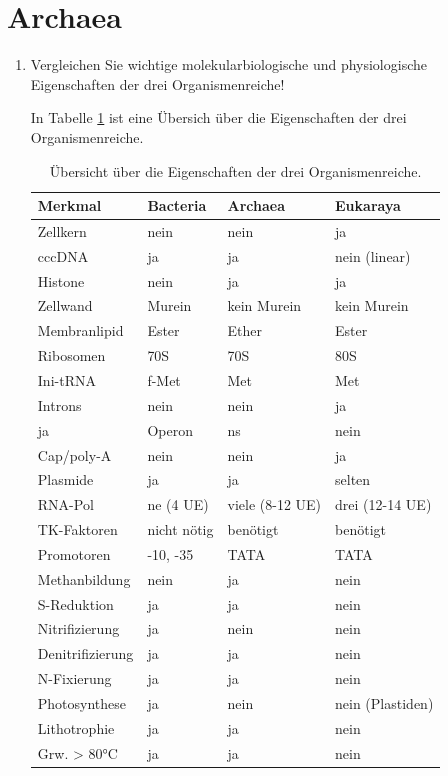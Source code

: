 \section{Archaea}
\begin{enumerate}
	\item Vergleichen Sie wichtige molekularbiologische und physiologische Eigenschaften der drei Organismenreiche!
		
		In Tabelle \ref{tab:domaenenuberblick} ist eine Übersich über die Eigenschaften der drei Organismenreiche.	

		\begin{table}[h!]
		\begin{center}
		\begin{tabular}{l l l l} 
		\toprule
		Merkmal		&	Bacteria		&	 Archaea				&	 Eukaraya		\\
		\midrule
		Zellkern 	&	nein			&	 nein					&	 ja		\\
		cccDNA		&	ja				&	 ja					&	 nein (linear)			\\
		Histone		&	nein			&	 ja					&	 ja		\\
		Zellwand		&	Murein		&	 kein Murein		&	 kein Murein		\\
		Membranlipid&	Ester			&	 Ether				&	 Ester		\\
		\midrule
		Ribosomen	&	70S			&	 70S					&	 80S		\\
		Ini-tRNA		&	f-Met			&	 Met					&	 Met		\\
		Introns 		&	nein			&	 nein					&	 ja		\\
		ja				&	Operon		&	 ns					&	 nein		\\
		Cap/poly-A 	&	nein			&	 nein					&	 ja		\\
		Plasmide		&	ja				&	 ja					&	 selten		\\
		RNA-Pol			&	ne (4 UE)	&	 viele (8-12 UE)	&	drei (12-14 UE)	\\
		TK-Faktoren		&	nicht nötig	&	 benötigt			&	benötigt		\\
		Promotoren		&	-10, -35		&	 TATA					&	TATA		\\
		\midrule
		Methanbildung		&	nein			&	 ja					&	nein		\\
		S-Reduktion		&	ja				&	 ja					&	nein		\\
		Nitrifizierung	&	ja				&	 nein					&	nein		\\
		Denitrifizierung		&	ja				&	 ja					&	nein		\\
		N-Fixierung		&	ja				&	 ja					&	nein		\\
		Photosynthese		&	ja				&	 nein					&	nein (Plastiden)	\\
		Lithotrophie	&	ja				&	 ja					&	nein		\\
		Grw. > 80°C		&	ja				&	 ja					&	nein		\\
		\bottomrule
		\end{tabular}
		\label{tab:domaenenuberblick}
		\caption{Übersicht über die Eigenschaften der drei Organismenreiche.}
		\end{center}
		\end{table}


\end{enumerate}
